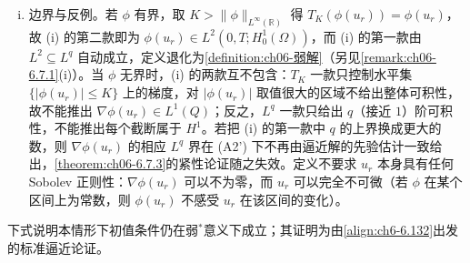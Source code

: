 \documentclass[../../main.tex]{subfiles}%
\begin{document}
\begin{remark}
\begin{enumerate}[(i)]
\item 边界与反例。若 $\phi$ 有界，取 $K>\|\phi\|_{L^\infty(\mathbb{R})}$ 得 $T_K(\phi(u_r))=\phi(u_r)$，故 (i) 的第二款即为 $\phi(u_r)\in L^2(0,T;H^1_0(\Omega))$，而 (i) 的第一款由 $L^2\subseteq L^q$ 自动成立，定义退化为\cref{definition:ch06-弱解}（另见\cref{remark:ch06-6.7.1}(i)）。当 $\phi$ 无界时，(i) 的两款互不包含：$T_K$ 一款只控制水平集 $\{|\phi(u_r)|\leqslant K\}$ 上的梯度，对 $|\phi(u_r)|$ 取值很大的区域不给出整体可积性，故不能推出 $\nabla\phi(u_r)\in L^1(Q)$；反之，$L^q$ 一款只给出 $q$（接近 $1$）阶可积性，不能推出每个截断属于 $H^1$。若把 (i) 的第一款中 $q$ 的上界换成更大的数，则 $\nabla\phi(u_r)$ 的相应 $L^q$ 界在 (A2') 下不再由逼近解的先验估计一致给出，\cref{theorem:ch06-6.7.3}的紧性论证随之失效。定义不要求 $u_r$ 本身具有任何 Sobolev 正则性：$\nabla\phi(u_r)$ 可以不为零，而 $u_r$ 可以完全不可微（若 $\phi$ 在某个区间上为常数，则 $\phi(u_r)$ 不感受 $u_r$ 在该区间的变化）。
\end{enumerate}
\end{remark}

下式说明本情形下初值条件仍在弱$^*$意义下成立；其证明为由\eqref{align:ch6-6.132}出发的标准逼近论证。
\end{document}
